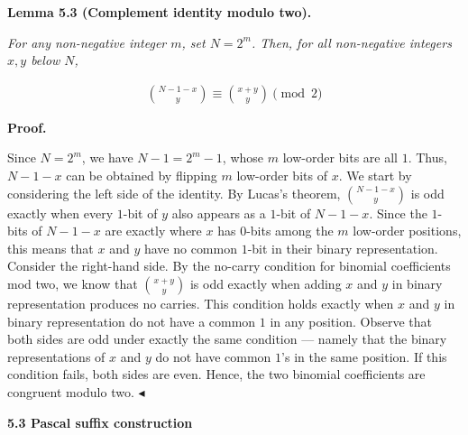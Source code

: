 

\par\medskip\noindent\textbf{
\textbf{Lemma 5.3}\textbf{ }(Complement identity modulo two)\textbf{.}
}\par



\emph{For any non-negative integer $m$, set $N=2^{m}$. Then, for all non-negative integers $x,y$ below $N$,}\par


\[\begin{gathered}
\binom{N-1-x}{y}\equiv\binom{x+y}{y}\pmod{2}
\end{gathered}\]







\par\medskip\noindent\textbf{Proof.}\par




Since $N=2^{m}$, we have $N-1=2^{m}-1$, whose $m$ low-order bits are all $1$. Thus, $N-1-x$ can be obtained by flipping $m$ low-order bits of $x$.
We start by considering the left side of the identity. By Lucas’s theorem, $\binom{N-1-x}{y}$ is odd exactly when every $1$-bit of $y$ also appears as a $1$-bit of $N-1-x$. Since the $1$-bits of $N-1-x$ are exactly where $x$ has $0$-bits among the $m$ low-order positions, this means that $x$ and $y$ have no common $1$-bit in their binary representation.
Consider the right-hand side. By the no-carry condition for binomial coefficients mod two, we know that $\binom{x+y}{y}$ is odd exactly when adding $x$ and $y$ in binary representation produces no carries. This condition holds exactly when $x$ and $y$ in binary representation do not have a common $1$ in any position.
Observe that both sides are odd under exactly the same condition — namely that the binary representations of $x$ and $y$ do not have common $1$’s in the same position. If this condition fails, both sides are even. Hence, the two binomial coefficients are congruent modulo two.
$\blacktriangleleft$\par






\par\medskip\noindent\textbf{
5.3 Pascal suffix construction}\par




